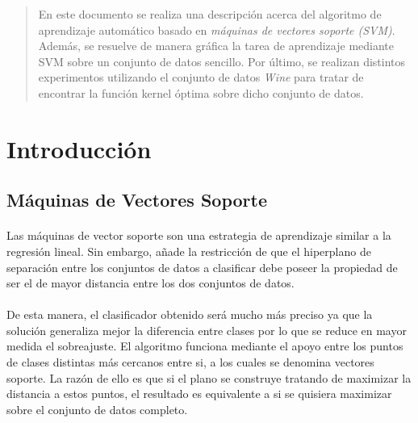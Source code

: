\documentclass{article}
\begin{document}
	\maketitle %

	\thispagestyle{firststyle}



	\begin{abstract}
		\noindent En este documento se realiza una descripción acerca del algoritmo de aprendizaje automático basado en \emph{máquinas de vectores soporte (SVM)}. Además, se resuelve de manera gráfica la tarea de aprendizaje mediante SVM sobre un conjunto de datos sencillo. Por último, se realizan distintos experimentos utilizando el conjunto de datos \emph{Wine} para tratar de encontrar la función kernel óptima sobre dicho conjunto de datos.
	\end{abstract}



	\section{Introducción}
	\label{sec:introducción}

		\subsection{Máquinas de Vectores Soporte}
		\label{sec:support-vector-machine}

			\paragraph{}
			Las máquinas de vector soporte son una estrategia de aprendizaje similar a la regresión lineal. Sin embargo, añade la restricción de que el hiperplano de separación entre los conjuntos de datos a clasificar debe poseer la propiedad de ser el de mayor distancia entre los dos conjuntos de datos.

			\paragraph{}
			De esta manera, el clasificador obtenido será mucho más preciso ya que la solución generaliza mejor la diferencia entre clases por lo que se reduce en mayor medida el sobreajuste. El algoritmo funciona mediante el apoyo entre los puntos de clases distintas más cercanos entre si, a los cuales se denomina vectores soporte. La razón de ello es que si el plano se construye tratando de maximizar la distancia a estos puntos, el resultado es equivalente a si se quisiera maximizar sobre el conjunto de datos completo.
\end{document}
